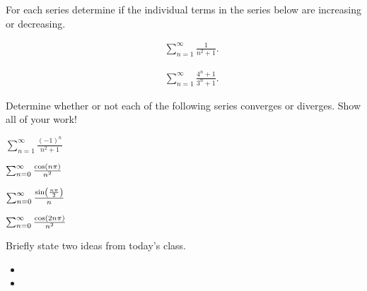 
\begin{problem}
\item For each series determine if the individual terms in the series
  below are increasing or decreasing.
  \begin{subproblem}
  \item 
    \begin{eqnarray*}
      & & \sum^\infty_{n=1} \frac{1}{n^2+1}.
    \end{eqnarray*}
    \vfill
  \item 
    \begin{eqnarray*}
      & & \sum^\infty_{n=1} \frac{4^n+1}{3^n+1}.
    \end{eqnarray*}
    \vfill
  \end{subproblem}
\end{problem}


\begin{problem}
\item Determine whether or not each of the following series converges
  or diverges. Show all of your work!
  \begin{subproblem}
    \item $\sum_{n=1}^\infty \frac{(-1)^n}{n^2+1}$
      \vfill
    \item $\sum_{n=0}^\infty \frac{\cos\left( n\pi \right)}{n^2}$
      \vfill
    \item $\sum_{n=0}^\infty \frac{\sin\left(\frac{n\pi}{2}\right)}{n} $
      \vfill
    \item $\sum_{n=0}^\infty \frac{\cos\left( 2n\pi \right)}{n^2}$
      \vfill
  \end{subproblem}
\end{problem}


\postClass

\begin{problem}
\item Briefly state two ideas from today's class.
  \begin{itemize}
  \item 
  \item 
  \end{itemize}
\item 
  \begin{subproblem}
    \item
  \end{subproblem}
\end{problem}


